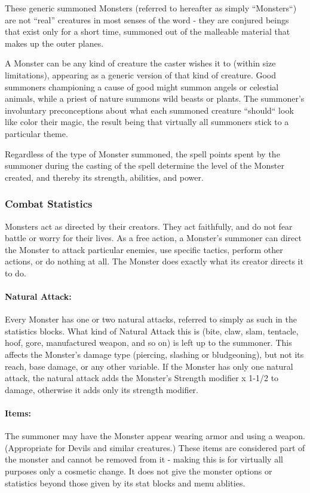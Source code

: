 These generic summoned Monsters (referred to hereafter as simply ``Monsters``) are not ``real'' creatures
in most senses of the word - they are conjured beings that exist only for a short time, summoned out
of the malleable material that makes up the outer planes.

A Monster can be any kind of creature the caster wishes it to (within size limitations), 
appearing as a generic version of that kind of creature.
Good summoners championing a cause of good might summon angels or celestial animals, while a priest of nature
summons wild beasts or plants.
The summoner's involuntary preconceptions about what each summoned creature ``should`` look like color their magic, 
the result being that virtually all summoners stick to a particular theme.

Regardless of the type of Monster summoned, the spell points spent by the summoner during the casting
of the spell determine the level of the Monster created, and thereby its strength, abilities, and power.
\subsubsection{Combat Statistics}
Monsters act as directed by their creators. They act faithfully, and do not fear battle or worry for their lives.
As a free action, a Monster's summoner can direct the Monster to attack particular enemies, 
use specific tactics, perform other actions, or do nothing at all. 
The Monster does exactly what its creator directs it to do.

\paragraph{Natural Attack:} Every Monster has one or two natural attacks, referred to simply as such in the statistics blocks.
What kind of Natural Attack this is (bite, claw, slam, tentacle, hoof, gore, manufactured weapon, and so on) is left up to the summoner.
This affects the Monster's damage type (piercing, slashing or bludgeoning), but not its reach, base damage, or any other variable.
If the Monster has only one natural attack, the natural attack adds the Monster's Strength modifier x 1-1/2 to damage, otherwise it adds only
its strength modifier.

\paragraph{Items:} The summoner may have the Monster appear wearing armor and using a weapon. (Appropriate for Devils and similar creatures.)
These items are considered part of the monster and cannot be removed from it - making this is for virtually all purposes only a cosmetic change. 
It does not give the monster options or statistics beyond those given by its stat blocks and menu ablities.

